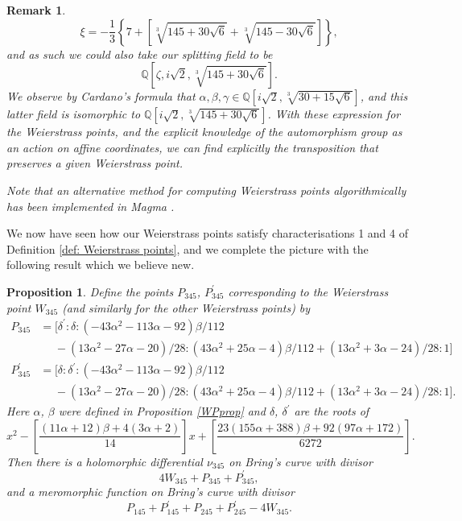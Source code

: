 \documentclass{amsart}
\newtheorem{prop}[theorem]{Proposition}
\newtheorem{remark}[theorem]{Remark}
\newcommand{\psquare}[1]{\left[ #1 \right]}
\newcommand{\pbrace}[1]{\left\{ #1 \right\} }
\begin{document}
\begin{remark}
\[
\xi = -\frac{1}{3}\pbrace{7+  \psquare{\sqrt[3]{145+30\sqrt{6}}+\sqrt[3]{145-30\sqrt{6}}}}  , 
\]
and as such we could also take our splitting field to be
\[
\mathbb{Q}\psquare{\zeta, i\sqrt{2}, \sqrt[3]{145+30\sqrt{6}}}  . 
\]
We observe by Cardano's formula that $\alpha, \beta, \gamma \in \mathbb{Q}[i\sqrt{2}, \sqrt[3]{30+15\sqrt{6}}]$, and this latter field is isomorphic to $\mathbb{Q}[i\sqrt{2}, \sqrt[3]{145+30\sqrt{6}}]$. With these expression for the Weierstrass points, and the explicit knowledge of the automorphism group as an action on affine coordinates, we can find explicitly the transposition that preserves a given Weierstrass point. 

Note that an alternative method for computing Weierstrass points algorithmically has been implemented in Magma \cite{Hess2002a}.
\end{remark}
We now have seen how our Weierstrass points satisfy characterisations 1 and 4 of Definition \ref{def: Weierstrass points}, and we complete the picture with the following result which we believe new. 
\begin{prop}\label{prop: function and divisor associated to WP}
Define the points $P_{345}$, $P^\prime_{345}$ corresponding to the Weierstrass point $W_{345}$ (and similarly for the other Weierstrass points) by 
\begin{align*}
    P_{345} &= [\delta^\prime : \delta : (-43\alpha^2 - 113\alpha - 92)\beta/112 \\
    &\phantom{=}- (13\alpha^2 - 27\alpha - 20)/28 : (43\alpha^2 + 25\alpha - 4)\beta/112 + (13\alpha^2 + 3\alpha - 24)/28 : 1] \\
    P^\prime_{345} &= [\delta : \delta^\prime : (-43\alpha^2 - 113\alpha - 92)\beta/112 \\
    &\phantom{=} - (13\alpha^2 - 27\alpha - 20)/28 : (43\alpha^2 + 25\alpha - 4)\beta/112 + (13\alpha^2 + 3\alpha - 24)/28 : 1].
\end{align*}
Here $\alpha$, $\beta$ were defined in Proposition \ref{WPprop} and $\delta$, $\delta^\prime$ are the roots of 
\[
x^2 - \psquare{\frac{(11 \alpha + 12)\beta + 4(3\alpha + 2)}{14}}x + \psquare{\frac{23(155\alpha + 388)\beta + 92(97\alpha + 172)}{6272}}  .
\]
Then there is a holomorphic differential $\nu_{345}$ on Bring's curve with divisor 
\[
4W_{345} + P_{345} + P_{345}^\prime  ,
\]
and a meromorphic function on Bring's curve with divisor
\[
P_{145} + P_{145}^\prime + P_{245} + P_{245}^\prime -4W_{345}  . 
\]
\end{prop}
\end{document}
